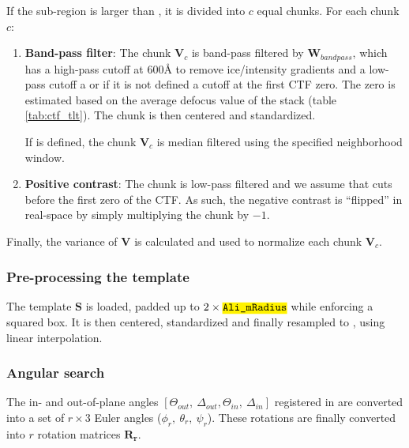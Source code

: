 If the sub-region is larger than , it is divided into $c$ equal chunks. For each chunk $c$:
\begin{enumerate}
    \item \textbf{Band-pass filter}: The chunk $\bm{V}_c$ is band-pass filtered by $\bm{W}_{bandpass}$, which has a high-pass cutoff at 600\r{A} to remove ice/intensity gradients and a low-pass cutoff a  or if it is not defined a cutoff at the first CTF zero. The zero is estimated based on the average defocus value of the stack (table \ref{tab:ctf_tlt}). The chunk is then centered and standardized.
    \begin{note}If  is defined, the chunk $\bm{V}_c$ is median filtered using the specified neighborhood window.\end{note}
    
    \item \textbf{Positive contrast}: The chunk is low-pass filtered and we assume that  cuts before the first zero of the CTF. As such, the negative contrast is ``flipped'' in real-space by simply multiplying the chunk by $-1$.
\end{enumerate}
Finally, the variance of $\bm{V}$ is calculated and used to normalize each chunk $\bm{V}_c$.

\subsubsection{Pre-processing the template}
The template $\bm{S}$ is loaded, padded up to $2\times\code{Ali\_mRadius}$ while enforcing a squared box. It is then centered, standardized and finally resampled to , using linear interpolation.

\subsubsection{Angular search}

The in- and out-of-plane angles $[\Theta_{out},\ \Delta_{out}, \Theta_{in},\ \Delta_{in}]$ registered in  are converted into a set of $r \times 3$ Euler angles ($\phi_{r},\ \theta_{r},\ \psi_{r}$). These rotations are finally converted into $r$ rotation matrices $\bm{R_{r}}$.


